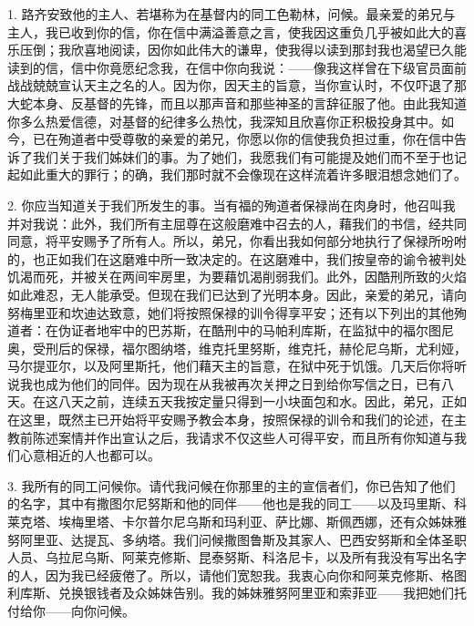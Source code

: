 \par

1. 路齐安致他的主人、若堪称为在基督内的同工色勒林，问候。最亲爱的弟兄与主人，我已收到你的信，你在信中满溢善意之言，使我因这重负几乎被如此大的喜乐压倒；我欣喜地阅读，因你如此伟大的谦卑，使我得以读到那封我也渴望已久能读到的信，信中你竟愿纪念我，在信中你向我说：——像我这样曾在下级官员面前战战兢兢宣认天主之名的人。因为你，因天主的旨意，当你宣认时，不仅吓退了那大蛇本身、反基督的先锋，而且以那声音和那些神圣的言辞征服了他。由此我知道你多么热爱信德，对基督的纪律多么热忱，我深知且欣喜你正积极投身其中。如今，已在殉道者中受尊敬的亲爱的弟兄，你愿以你的信使我负担过重，你在信中告诉了我们关于我们姊妹们的事。为了她们，我愿我们有可能提及她们而不至于也记起如此重大的罪行；的确，我们那时就不会像现在这样流着许多眼泪想念她们了。\par

2. 你应当知道关于我们所发生的事。当有福的殉道者保禄尚在肉身时，他召叫我并对我说：此外，我们所有主屈尊在这般磨难中召去的人，藉我们的书信，经共同同意，将平安赐予了所有人。所以，弟兄，你看出我如何部分地执行了保禄所吩咐的，也正如我们在这磨难中所一致决定的。在这磨难中，我们按皇帝的谕令被判处饥渴而死，并被关在两间牢房里，为要藉饥渴削弱我们。此外，因酷刑所致的火焰如此难忍，无人能承受。但现在我们已达到了光明本身。因此，亲爱的弟兄，请向努梅里亚和坎迪达致意，她们将按照保禄的训令得享平安；还有以下列出的其他殉道者：在伪证者地牢中的巴苏斯，在酷刑中的马帕利库斯，在监狱中的福尔图尼奥，受刑后的保禄，福尔图纳塔，维克托里努斯，维克托，赫伦尼乌斯，尤利娅，马尔提亚尔，以及阿里斯托，他们藉天主的旨意，在狱中死于饥饿。几天后你将听说我也成为他们的同伴。因为现在从我被再次关押之日到给你写信之日，已有八天。在这八天之前，连续五天我按定量只得到一小块面包和水。因此，弟兄，正如在这里，既然主已开始将平安赐予教会本身，按照保禄的训令和我们的论述，在主教前陈述案情并作出宣认之后，我请求不仅这些人可得平安，而且所有你知道与我们心意相近的人也都可以。\par

3. 我所有的同工问候你。请代我问候在你那里的主的宣信者们，你已告知了他们的名字，其中有撒图尔尼努斯和他的同伴——他也是我的同工——以及玛里斯、科莱克塔、埃梅里塔、卡尔普尔尼乌斯和玛利亚、萨比娜、斯佩西娜，还有众姊妹雅努阿里亚、达提瓦、多纳塔。我们问候撒图鲁斯及其家人、巴西安努斯和全体圣职人员、乌拉尼乌斯、阿莱克修斯、昆泰努斯、科洛尼卡，以及所有我没有写出名字的人，因为我已经疲倦了。所以，请他们宽恕我。我衷心向你和阿莱克修斯、格图利库斯、兑换银钱者及众姊妹告别。我的姊妹雅努阿里亚和索菲亚——我把她们托付给你——向你问候。\par

